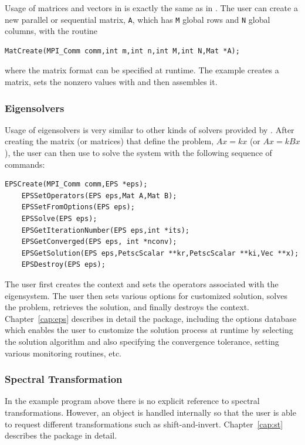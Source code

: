Usage of matrices and vectors in \slepc is exactly the same as in \petsc.
The user can create a new parallel or sequential matrix, \texttt{A}, which
has \texttt{M} global rows and \texttt{N} global columns, with the routine
	\begin{Verbatim}[fontsize=\small]
	MatCreate(MPI_Comm comm,int m,int n,int M,int N,Mat *A);
	\end{Verbatim}
where the matrix format can be specified at runtime. The example creates a matrix, sets the nonzero values with  and then assembles it.

\subsubsection*{Eigensolvers}

Usage of eigensolvers is very similar to other kinds of solvers provided by \petsc.
After creating the matrix (or matrices) that define the problem,
$Ax = kx$ (or $Ax=kBx$), the user can then use  to solve the system 
with the following sequence of commands: 
 
  
	\begin{Verbatim}[fontsize=\small,numbers=none]
	EPSCreate(MPI_Comm comm,EPS *eps);
	EPSSetOperators(EPS eps,Mat A,Mat B);
	EPSSetFromOptions(EPS eps);
	EPSSolve(EPS eps);
	EPSGetIterationNumber(EPS eps,int *its);
	EPSGetConverged(EPS eps, int *nconv);
	EPSGetSolution(EPS eps,PetscScalar **kr,PetscScalar **ki,Vec **x);
	EPSDestroy(EPS eps);
	\end{Verbatim}
The user first creates the  context and sets the operators
associated with the eigensystem. The user then sets various options for
customized solution, solves the problem, retrieves the solution, 
and finally destroys the  context.
Chapter~\ref{cap:eps} describes in detail the  package, including
the options database which enables the user to customize the solution
process at runtime by selecting the solution algorithm and also specifying the convergence tolerance, setting various monitoring routines, etc.

\subsubsection*{Spectral Transformation}

In the example program above there is no explicit reference to spectral transformations. However, an  object is handled internally so that the user is able to request different transformations such as shift-and-invert.
Chapter~\ref{cap:st} describes the  package in detail.

